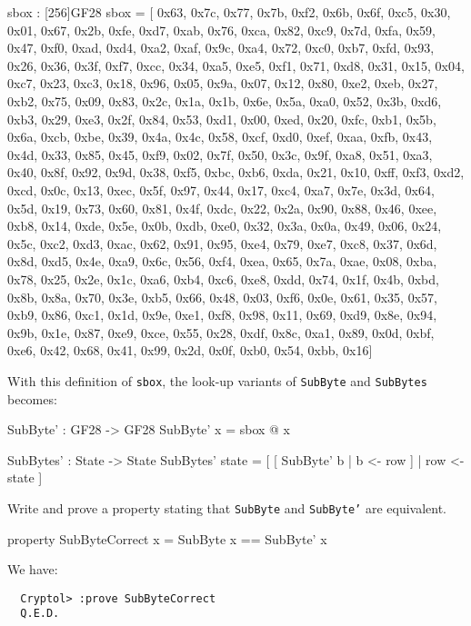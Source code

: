 \vspace{0.25cm}
\begin{minipage}{\textwidth}
{\footnotesize
\begin{code}
  sbox : [256]GF28
  sbox = [
     0x63, 0x7c, 0x77, 0x7b, 0xf2, 0x6b, 0x6f, 0xc5, 0x30, 0x01, 0x67,
     0x2b, 0xfe, 0xd7, 0xab, 0x76, 0xca, 0x82, 0xc9, 0x7d, 0xfa, 0x59,
     0x47, 0xf0, 0xad, 0xd4, 0xa2, 0xaf, 0x9c, 0xa4, 0x72, 0xc0, 0xb7,
     0xfd, 0x93, 0x26, 0x36, 0x3f, 0xf7, 0xcc, 0x34, 0xa5, 0xe5, 0xf1,
     0x71, 0xd8, 0x31, 0x15, 0x04, 0xc7, 0x23, 0xc3, 0x18, 0x96, 0x05,
     0x9a, 0x07, 0x12, 0x80, 0xe2, 0xeb, 0x27, 0xb2, 0x75, 0x09, 0x83,
     0x2c, 0x1a, 0x1b, 0x6e, 0x5a, 0xa0, 0x52, 0x3b, 0xd6, 0xb3, 0x29,
     0xe3, 0x2f, 0x84, 0x53, 0xd1, 0x00, 0xed, 0x20, 0xfc, 0xb1, 0x5b,
     0x6a, 0xcb, 0xbe, 0x39, 0x4a, 0x4c, 0x58, 0xcf, 0xd0, 0xef, 0xaa,
     0xfb, 0x43, 0x4d, 0x33, 0x85, 0x45, 0xf9, 0x02, 0x7f, 0x50, 0x3c,
     0x9f, 0xa8, 0x51, 0xa3, 0x40, 0x8f, 0x92, 0x9d, 0x38, 0xf5, 0xbc,
     0xb6, 0xda, 0x21, 0x10, 0xff, 0xf3, 0xd2, 0xcd, 0x0c, 0x13, 0xec,
     0x5f, 0x97, 0x44, 0x17, 0xc4, 0xa7, 0x7e, 0x3d, 0x64, 0x5d, 0x19,
     0x73, 0x60, 0x81, 0x4f, 0xdc, 0x22, 0x2a, 0x90, 0x88, 0x46, 0xee,
     0xb8, 0x14, 0xde, 0x5e, 0x0b, 0xdb, 0xe0, 0x32, 0x3a, 0x0a, 0x49,
     0x06, 0x24, 0x5c, 0xc2, 0xd3, 0xac, 0x62, 0x91, 0x95, 0xe4, 0x79,
     0xe7, 0xc8, 0x37, 0x6d, 0x8d, 0xd5, 0x4e, 0xa9, 0x6c, 0x56, 0xf4,
     0xea, 0x65, 0x7a, 0xae, 0x08, 0xba, 0x78, 0x25, 0x2e, 0x1c, 0xa6,
     0xb4, 0xc6, 0xe8, 0xdd, 0x74, 0x1f, 0x4b, 0xbd, 0x8b, 0x8a, 0x70,
     0x3e, 0xb5, 0x66, 0x48, 0x03, 0xf6, 0x0e, 0x61, 0x35, 0x57, 0xb9,
     0x86, 0xc1, 0x1d, 0x9e, 0xe1, 0xf8, 0x98, 0x11, 0x69, 0xd9, 0x8e,
     0x94, 0x9b, 0x1e, 0x87, 0xe9, 0xce, 0x55, 0x28, 0xdf, 0x8c, 0xa1,
     0x89, 0x0d, 0xbf, 0xe6, 0x42, 0x68, 0x41, 0x99, 0x2d, 0x0f, 0xb0,
     0x54, 0xbb, 0x16]
\end{code}
}
\end{minipage}
\vspace{0.25cm}

\noindent With this definition of {\tt sbox}, the look-up variants of
{\tt SubByte} and {\tt SubBytes} becomes:\label{aes:subbytetl}
\begin{code}
  SubByte' : GF28 -> GF28
  SubByte' x = sbox @ x

  SubBytes' : State -> State
  SubBytes' state = [ [ SubByte' b | b <- row ] | row <- state ]
\end{code}

\begin{Exercise}\label{ex:sbox}
  Write and prove a property stating that {\tt SubByte} and 
    {\tt SubByte'} are equivalent.
\end{Exercise}
\begin{Answer}
\begin{code}
  property SubByteCorrect x = SubByte x == SubByte' x
\end{code}
We have:
\begin{Verbatim}
  Cryptol> :prove SubByteCorrect
  Q.E.D.
\end{Verbatim}
\end{Answer}


